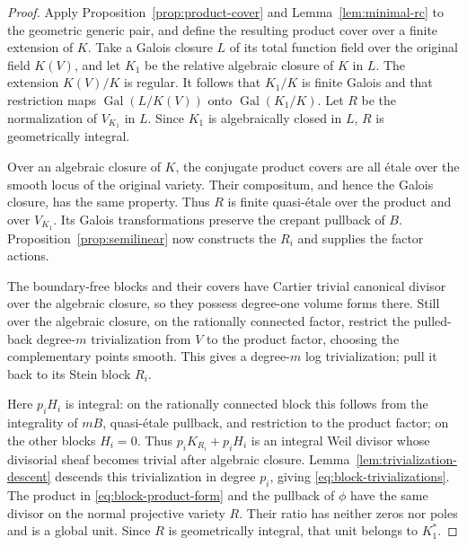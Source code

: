 \begin{proof}
Apply Proposition~\ref{prop:product-cover} and
Lemma~\ref{lem:minimal-rc} to the geometric generic pair, and
define the resulting product cover over a finite extension of $K$.
Take a Galois closure $L$ of its total function field over the
original field $K(V)$, and let $K_1$ be the relative algebraic
closure of $K$ in $L$.  The extension $K(V)/K$ is regular.
It follows that $K_1/K$ is finite Galois and that restriction maps
$\operatorname{Gal}(L/K(V))$ onto
$\operatorname{Gal}(K_1/K)$.  Let $R$ be the normalization of
$V_{K_1}$ in $L$.  Since $K_1$ is algebraically closed in $L$,
$R$ is geometrically integral.

Over an algebraic closure of $K$, the conjugate product covers are
all \'etale over the smooth locus of the original variety.  Their
compositum, and hence the Galois closure, has the same property.
Thus $R$ is finite quasi-\'etale over the product and over
$V_{K_1}$.  Its Galois transformations preserve the crepant
pullback of $B$.  Proposition~\ref{prop:semilinear} now constructs
the $R_i$ and supplies the factor actions.

The boundary-free blocks and their covers have Cartier trivial
canonical divisor over the algebraic closure, so they possess
degree-one volume forms there.  Still over the algebraic closure,
on the rationally connected factor,
restrict the pulled-back degree-$m$ trivialization from $V$ to
the product factor, choosing the complementary points smooth.
This gives a degree-$m$ log trivialization; pull it back to its
Stein block $R_i$.

Here $p_iH_i$ is integral: on the rationally connected block this
follows from the integrality of $mB$, quasi-\'etale pullback, and
restriction to the product factor; on the other blocks $H_i=0$.
Thus $p_iK_{R_i}+p_iH_i$ is an integral Weil divisor whose
divisorial sheaf becomes trivial after algebraic closure.
Lemma~\ref{lem:trivialization-descent} descends this trivialization
in degree $p_i$, giving \eqref{eq:block-trivializations}.  The product
in \eqref{eq:block-product-form} and the pullback of $\phi$ have
the same divisor on the normal projective variety $R$.  Their
ratio has neither zeros nor poles and is a global unit.  Since
$R$ is geometrically integral, that unit belongs to $K_1^*$.
\end{proof}

